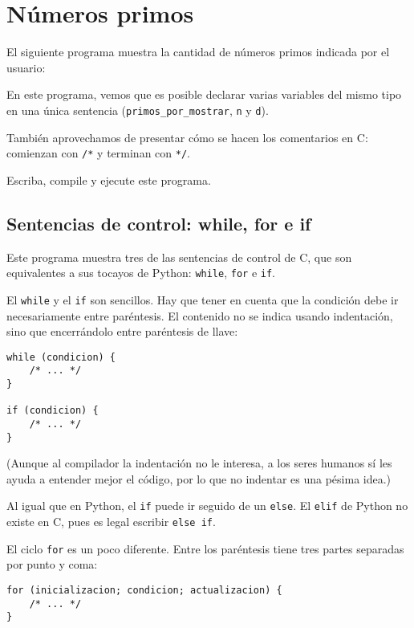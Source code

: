 \section{Números primos}

El siguiente programa muestra la cantidad de números primos indicada por
el usuario:

En este programa, vemos que es posible declarar varias variables del
mismo tipo en una única sentencia (\lstinline!primos_por_mostrar!,
\lstinline!n! y \lstinline!d!).

También aprovechamos de presentar cómo se hacen los comentarios en C:
comienzan con \lstinline!/*! y terminan con \lstinline!*/!.

Escriba, compile y ejecute este programa.

\subsection{Sentencias de control: while, for e if}

Este programa muestra tres de las sentencias de control de C, que son
equivalentes a sus tocayos de Python: \lstinline!while!, \lstinline!for!
e \lstinline!if!.

El \lstinline!while! y el \lstinline!if! son sencillos. Hay que tener en
cuenta que la condición debe ir necesariamente entre paréntesis. El
contenido no se indica usando indentación, sino que encerrándolo entre
paréntesis de llave:

\begin{lstlisting}
while (condicion) {
    /* ... */
}

if (condicion) {
    /* ... */
}
\end{lstlisting}

(Aunque al compilador la indentación no le interesa, a los seres humanos
sí les ayuda a entender mejor el código, por lo que no indentar es una
pésima idea.)

Al igual que en Python, el \lstinline!if! puede ir seguido de un
\lstinline!else!. El \lstinline!elif! de Python no existe en C, pues es
legal escribir \lstinline!else if!.

El ciclo \lstinline!for! es un poco diferente. Entre los paréntesis
tiene tres partes separadas por punto y coma:

\begin{lstlisting}
for (inicializacion; condicion; actualizacion) {
    /* ... */
}
\end{lstlisting}

